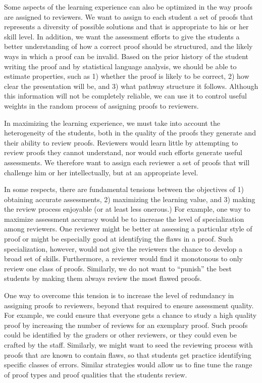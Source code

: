 \documentclass[12pt]{article}
\begin{document}
Some aspects of the learning experience can also be optimized in the way
proofs are assigned to reviewers.  We want to assign to each student
a set of proofs that represents a diversity of possible solutions and
that is appropriate to his or her skill level.  In addition, we want
the assessment efforts to give the students a better understanding of
how a correct proof should be structured, and the likely ways in which
a proof can be invalid.
Based on the
prior history of the student writing the proof and by statistical
language analysis, we should be able to estimate properties, such as
1) whether the proof is likely to be correct, 2) how clear the presentation
will be, and 3) what pathway structure it follows.  Although this
information will not be completely reliable, we can use it to control
useful weights in the random process of assigning proofs to reviewers.

In maximizing the learning experience, we must take into account the
heterogeneity of the students, both in the quality of the proofs they
generate and their ability to review proofs.  Reviewers would learn
little by attempting to review proofs they cannot understand, nor
would such efforts generate useful assessments.  We therefore want to
assign each reviewer a set of proofs that will challenge him or her
intellectually, but at an appropriate level.

In some respects, there are fundamental tensions between the
objectives of 1) obtaining accurate assessments, 2) maximizing the
learning value, and 3) making the review process enjoyable (or at
least less onerous.)  For example, one way to maximize assessment
accuracy would be to increase the level of specialization among
reviewers.  One reviewer might be better at assessing a particular
style of proof or might be especially good at identifying the flaws in
a proof.  Such specialization, however, would not give the reviewers
the chance to develop a broad set of skills.  Furthermore, a reviewer
would find it monotonous to only review one class of proofs.
Similarly, we do not want to ``punish'' the best students by making
them always review the most flawed proofs.

One way to overcome this tension is to increase the level of
redundancy in assigning proofs to reviewers, beyond that required to
ensure assessment quality.  For example, we could ensure that everyone
gets a chance to study a high quality proof by increasing the number
of reviews for an exemplary proof.  Such proofs could be identified by
the graders or other reviewers, or they could even be crafted by the
staff.  Similarly, we might want to seed the reviewing process with
proofs that are known to contain flaws, so that students get
practice identifying specific classes of errors.  Similar strategies
would allow us to fine tune the range of proof types and proof
qualities that the students review.
\end{document}

